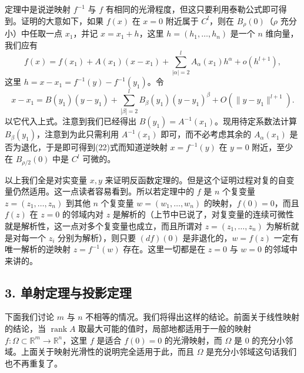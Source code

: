 定理中是说逆映射 $f^{-1}$ 与 $f$ 有相同的光滑程度，但这只要利用泰勒公式即可得到。证明的大意如下，如果 $f(x)$ 在 $x=0$ 附近属于 $C^l$，则在 $B_\rho(0)$（$\rho$ 充分小）中任取一点 $x_1$，并记 $x=x_1+h$，这里 $h=(h_1,\ldots,h_n)$ 是一个 $n$ 维向量，我们应有
\[
 f(x)=f(x_1)+A(x_1)(x-x_1)+\sum_{|\alpha|=2}^{l}A_\alpha(x_1)h^\alpha+o(h^{l+1}),
\]
这里 $h=x-x_1=f^{-1}(y)-f^{-1}(y_1)$。令
\begin{equation}
 x-x_1=B(y_1)(y-y_1)+\sum_{|\beta|=2}^{l}B_\beta(y_1)(y-y_1)^\beta+O(\|y-y_1\|^{l+1}).
 \tag{22}
\end{equation}
以它代入上式。注意到我们已经得出 $B(y_1)=A^{-1}(x_1)$。现用待定系数法计算 $B_\beta(y_1)$，注意到为此只需利用 $A^{-1}(x_1)$ 即可，而不必考虑其余的 $A_\alpha(x_1)$ 是否为退化，于是即可得到(22)式而知道逆映射 $x=f^{-1}(y)$ 在 $y=0$ 附近，至少在 $B_{\rho/2}(0)$ 中是 $C^l$ 可微的。

以上我们全是对实变量 $x,y$ 来证明反函数定理的。但是这个证明过程对复的自变量仍然适用。这一点读者容易看到。所以若定理中的 $f$ 是 $n$ 个复变量 $z=(z_1,\ldots,z_n)$ 到其他 $n$ 个复变量 $w=(w_1,\ldots,w_n)$ 的映射，$f(0)=0$，而且 $f(z)$ 在 $z=0$ 的邻域内对 $z$ 是解析的（上节中已说了，对复变量的连续可微性就是解析性，这一点对多个复变量也成立，而且所谓对 $z=(z_1,\ldots,z_n)$ 为解析就是对每一个 $z_i$ 分别为解析），则只要 $(df)(0)$ 是非退化的，$w=f(z)$ 一定有唯一解析的逆映射 $z=f^{-1}(w)$ 存在。这里一切都是在 $z=0$ 与 $w=0$ 的邻域中来讲的。


\subsection*{3. 单射定理与投影定理}

下面我们讨论 $m$ 与 $n$ 不相等的情况。我们将得出这样的结论。前面关于线性映射的结论，当 $\operatorname{rank}A$ 取最大可能的值时，局部地都适用于一般的映射 $f:\Omega\subset\mathbb R^m\to\mathbb R^n$，这里 $f$ 是适合 $f(0)=0$ 的光滑映射，而 $\Omega$ 是 $0$ 的充分小邻域。上面关于映射光滑性的说明完全适用于此，而且 $\Omega$ 是充分小邻域这句话我们也不再重复了。

